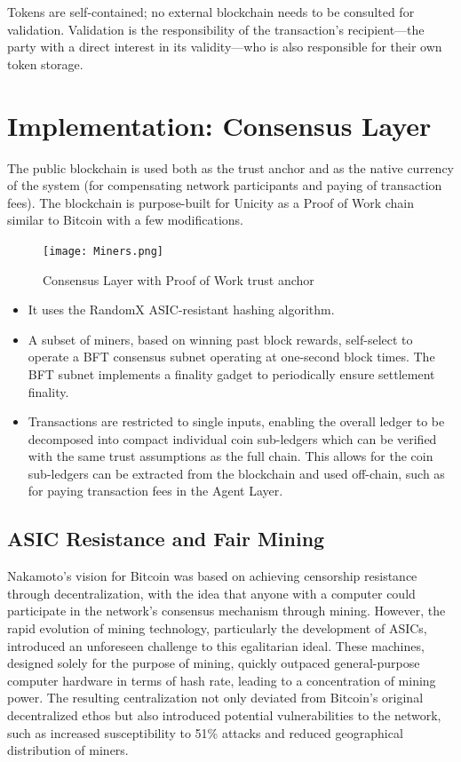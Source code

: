 \documentclass{article}
\begin{document}
Tokens are self-contained; no external blockchain needs to be consulted for validation. Validation is the responsibility of the transaction's recipient---the party with a direct interest in its validity---who is also responsible for their own token storage.

\section{Implementation: Consensus Layer}

The public blockchain is used both as the trust anchor and as the native currency of the system (for compensating network participants and paying of transaction fees). The blockchain is purpose-built for Unicity as a Proof of Work chain similar to Bitcoin with a few modifications.

\begin{figure}[htbp]
    \centering
    \texttt{[image: Miners.png]}
    \caption{Consensus Layer with Proof of Work trust anchor}
    \label{fig:miners}
\end{figure}

\begin{itemize}
\setlength{\leftmargin}{1em}
 \item It uses the RandomX ASIC-resistant hashing algorithm.
 \item A subset of miners, based on winning past block rewards, self-select to operate a BFT consensus subnet operating at one-second block times. The BFT subnet implements a finality gadget to periodically ensure settlement finality.
 \item Transactions are restricted to single inputs, enabling the overall ledger to be decomposed into compact individual coin sub-ledgers which can be verified with the same trust assumptions as the full chain.  This allows for the coin sub-ledgers can be extracted from the blockchain and used off-chain, such as for paying transaction fees in the Agent Layer.
\end{itemize}

\subsection{ASIC Resistance and Fair Mining}

Nakamoto's vision for Bitcoin was based on achieving censorship resistance through decentralization, with the idea that anyone with a computer could participate in the network's consensus mechanism through mining. However, the rapid evolution of mining technology, particularly the development of ASICs, introduced an unforeseen challenge to this egalitarian ideal. These machines, designed solely for the purpose of mining, quickly outpaced general-purpose computer hardware in terms of hash rate, leading to a concentration of mining power. The resulting centralization not only deviated from Bitcoin's original decentralized ethos but also introduced potential vulnerabilities to the network, such as increased susceptibility to 51\% attacks and reduced geographical distribution of miners.
\end{document}
